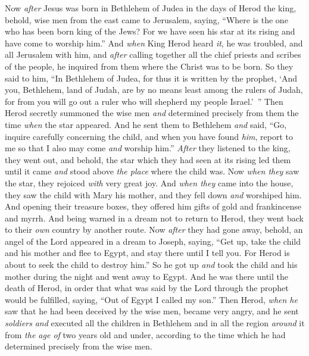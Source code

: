 \begin{biblechapter} %
 Now \textit{after} Jesus was born in Bethlehem of Judea in the days of Herod the king, behold, wise men from the east came to Jerusalem,
\verse saying, “Where is the one who has been born king of the Jews? For we have seen his star at its rising and have come to worship him.”
\verse And \textit{when} King Herod heard \textit{it}, he was troubled, and all Jerusalem with him,
\verse and \textit{after} calling together all the chief priests and scribes of the people, he inquired from them where the Christ was to be born.
\verse So they said to him, “In Bethlehem of Judea, for thus it is written by the prophet,
\verse ‘And you, Bethlehem, land of Judah, 
are by no means least among the rulers of Judah, 
for from you will go out a ruler 
who will shepherd my people Israel.’ ”
\verse Then Herod secretly summoned the wise men \textit{and} determined precisely from them the time \textit{when} the star appeared.
\verse And he sent them to Bethlehem \textit{and} said, “Go, inquire carefully concerning the child, and when you have found \textit{him}, report to me so that I also may come \textit{and} worship him.”
\verse \textit{After} they listened to the king, they went out, and behold, the star which they had seen at its rising led them until it came \textit{and} stood above \textit{the place} where the child was.
\verse Now \textit{when they} saw the star, they rejoiced \textit{with} very great joy.
\verse And \textit{when they} came into the house, they saw the child with Mary his mother, and they fell down \textit{and} worshiped him. And opening their treasure boxes, they offered him gifts of gold and frankincense and myrrh.
\verse And being warned in a dream not to return to Herod, they went back to their \textit{own} country by another route.
 Now \textit{after} they had gone away, behold, an angel of the Lord appeared in a dream to Joseph, saying, “Get up, take the child and his mother and flee to Egypt, and stay there until I tell you. For Herod is about to seek the child to destroy him.”
\verse So he got up \textit{and} took the child and his mother during the night and went away to Egypt.
\verse And he was there until the death of Herod, in order that what was said by the Lord through the prophet would be fulfilled, saying, “Out of Egypt I called my son.”
 Then Herod, \textit{when he} saw that he had been deceived by the wise men, became very angry, and he sent \textit{soldiers} \textit{and} executed all the children in Bethlehem and in all the region \textit{around} it from \textit{the age of} two years old and under, according to the time which he had determined precisely from the wise men.

\end{biblechapter}
